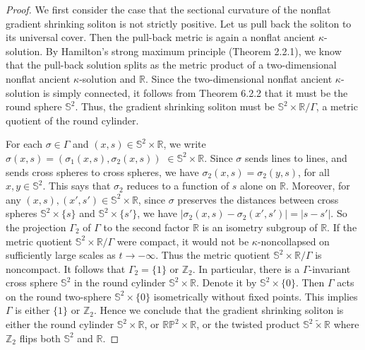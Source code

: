 \begin{proof}
We first consider the case that the sectional curvature of the
nonflat gradient shrinking soliton is not strictly positive. Let
us pull back the soliton to its universal cover. Then the
pull-back metric is again a nonflat ancient $\kappa$-solution. By
Hamilton's strong maximum principle (Theorem 2.2.1), we know that
the pull-back solution splits as the metric product of a
two-dimensional nonflat ancient $\kappa$-solution and
$\mathbb{R}$. Since the two-dimensional nonflat ancient
$\kappa$-solution is simply connected, it follows from Theorem
6.2.2 that it must be the round sphere $\mathbb{S}^2$. Thus, the
gradient shrinking soliton must be $\mathbb{S}^2\times\mathbb{R}
/\Gamma$, a metric quotient of the round cylinder.

For each $\sigma \in \Gamma$ and $(x,s) \in
\mathbb{S}^2\times\mathbb{R}$, we write $\sigma(x,s) =
(\sigma_1(x,s),\sigma_2(x,s))$ $\in \mathbb{S}^2\times\mathbb{R}$.
Since $\sigma$ sends lines to lines, and sends cross spheres to
cross spheres, we have $\sigma_2(x,s) = \sigma_2(y,s)$, for all
$x, y \in \mathbb{S}^2$. This says that $\sigma_2$ reduces to a
function of $s$ alone on $\mathbb{R}$. Moreover, for any $(x,s),
(x',s') \in \mathbb{S}^2\times\mathbb{R}$, since $\sigma$
preserves the distances between cross spheres $\mathbb{S}^2 \times
\{s\}$ and $\mathbb{S}^2 \times \{s'\}$, we have $|\sigma_2(x,s) -
\sigma_2(x',s')| = |s-s'|$. So the projection $\Gamma_2$ of
$\Gamma$ to the second factor $\mathbb{R}$ is an isometry subgroup
of $\mathbb{R}$. If the metric quotient
$\mathbb{S}^2\times\mathbb{R} /\Gamma$
 were compact, it would not be $\kappa$-noncollapsed on sufficiently
large scales as $t \rightarrow -\infty$. Thus the metric quotient
$\mathbb{S}^2\times\mathbb{R} /\Gamma$ is noncompact. It follows
that $\Gamma_2 = \{1\} \mbox{ or } \mathbb{Z}_2$. In particular,
there is a $\Gamma$-invariant cross sphere $\mathbb{S}^2$ in the
round cylinder $\mathbb{S}^2\times\mathbb{R}$. Denote it by
$\mathbb{S}^2\times \{0\}$. Then $\Gamma$ acts on the round
two-sphere $\mathbb{S}^2\times \{0\}$ isometrically without fixed
points. This implies $\Gamma$ is either $\{1\}$ or $\mathbb{Z}_2$.
Hence we conclude that the gradient shrinking soliton is either
the round cylinder $\mathbb{S}^2\times\mathbb{R}$, or
$\mathbb{R}\mathbb{P}^2 \times \mathbb{R}$, or the twisted product
$\mathbb{S}^2 \tilde{\times} \mathbb{R}$ where $\mathbb{Z}_2$
flips both $\mathbb{S}^2$ and $\mathbb{R}$.


\end{proof}
